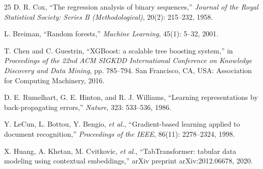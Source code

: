 \begin{thebibliography}{25}
D. R. Cox, ``The regression analysis of binary sequences,'' \emph{Journal of the Royal Statistical Society: Series B (Methodological)}, 20(2): 215--232, 1958.

L. Breiman, ``Random forests,'' \emph{Machine Learning}, 45(1): 5--32, 2001.

T. Chen and C. Guestrin, ``XGBoost: a scalable tree boosting system,'' in \emph{Proceedings of the 22nd ACM SIGKDD International Conference on Knowledge Discovery and Data Mining}, pp. 785--794. San Francisco, CA, USA: Association for Computing Machinery, 2016.

D. E. Rumelhart, G. E. Hinton, and R. J. Williams, ``Learning representations by back-propagating errors,'' \emph{Nature}, 323: 533--536, 1986.

Y. LeCun, L. Bottou, Y. Bengio, \emph{et al.}, ``Gradient-based learning applied to document recognition,'' \emph{Proceedings of the IEEE}, 86(11): 2278--2324, 1998.

X. Huang, A. Khetan, M. Cvitkovic, \emph{et al.}, ``TabTransformer: tabular data modeling using contextual embeddings,'' arXiv preprint arXiv:2012.06678, 2020.

\end{thebibliography}
